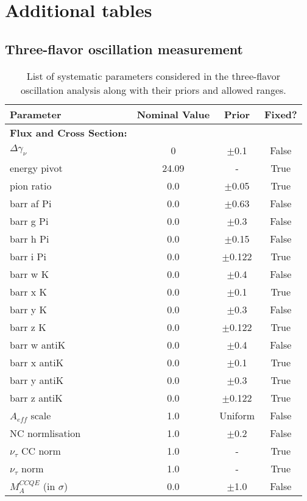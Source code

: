 \chapter{Additional tables}
\label{ch:tables}
\section{Three-flavor oscillation measurement}

\begin{table}
  \centering
  \caption{List of systematic parameters considered in the three-flavor oscillation analysis along with their priors and allowed ranges.}
  \label{tab:sys-params-three-flavor}
\begin{tabular}{lccc} \toprule
\hline
Parameter  & Nominal Value & Prior & Fixed? \\ \hline
\textbf{Flux and Cross Section:}   &     &    \\
$\Delta \gamma_\nu$ & 0 & $\pm$0.1 & False \\
energy pivot & 24.09 & - &  True \\
pion ratio & 0.0 & $\pm$0.05 & True \\
barr af Pi & 0.0  & $\pm$0.63 & False \\
barr g Pi & 0.0  & $\pm$0.3 & False \\
barr h Pi & 0.0  & $\pm$0.15 & False \\
barr i Pi  & 0.0  & $\pm$0.122 & True \\
barr w K & 0.0  & $\pm$0.4 & False \\
barr x K & 0.0  & $\pm$0.1 & True \\
barr y K & 0.0  & $\pm$0.3 & False \\
barr z K & 0.0  & $\pm$0.122 & True \\
barr w antiK & 0.0  & $\pm$0.4 & False \\
barr x antiK & 0.0  & $\pm$0.1 & True \\
barr y antiK & 0.0  & $\pm$0.3 & True \\
barr z antiK & 0.0  & $\pm$0.122 & True \\ \hline
$A_{eff}$ scale & 1.0 & Uniform & False \\
NC normlisation & 1.0 & $\pm$0.2 & False\\
$\nu_{\tau}$ CC norm & 1.0 & - & True\\
$\nu_{\tau}$ norm & 1.0 & - & True\\
$M_{A}^{CCQE}$ (in $\sigma$)& 0.0 & $\pm$1.0 & False  \\

\end{tabular}
\end{table}
